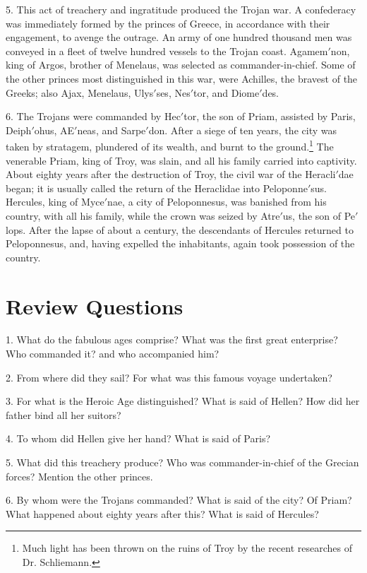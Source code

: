 \documentclass[openany,a4paper]{memoir}
\begin{document}
5. This act of treachery and ingratitude produced the Trojan war. A confederacy was immediately formed by the 
princes of Greece, in accordance with their engagement, to 
avenge the outrage. An army of one hundred thousand men 
was conveyed in a fleet of twelve hundred vessels to the 
Trojan coast. Agamem$'$non, king of Argos, brother of Menelaus, was selected as commander-in-chief. Some of the other 
princes most distinguished in this war, were Achilles, the 
bravest of the Greeks; also Ajax, Menelaus, Ulys$'$ses, Nes$'$tor, and Diome$'$des. 

6. The Trojans were commanded by Hec$'$tor, the son of 
Priam, assisted by Paris, Deiph$'$ohus, AE$'$neas, and Sarpe$'$don. After a siege of ten years, the city was taken by 
stratagem, plundered of its wealth, and burnt to the ground.\footnote{Much light has been thrown on the ruins of Troy by the recent researches of Dr. Schliemann.} 
The venerable Priam, king of Troy, was slain, and all his 
family carried into captivity. About eighty years after the 
destruction of Troy, the civil war of the Heracli$'$dae began; 
it is usually called the return of the Heraclidae into Peloponne$'$sus. Hercules, king of Myce$'$nae, a city of Peloponnesus, 
was banished from his country, with all his family, while 
the crown was seized by Atre$'$us, the son of Pe$'$lops. After 
the lapse of about a century, the descendants of Hercules returned to Peloponnesus, and, having expelled the inhabitants, 
again took possession of the country. 



\section{Review Questions}



1. What do the fabulous ages comprise? What was the 
first great enterprise? Who commanded it? and who accompanied 
him? 

2. From where did they sail? For what was this famous voyage 
undertaken?

3. For what is the Heroic Age distinguished? What is 
said of Hellen? How did her father bind all her suitors? 

4. To whom did Hellen give her hand? What is said of Paris? 

5. What did this treachery produce? Who was commander-in-chief of 
the Grecian forces? Mention the other princes.

6. By whom were 
the Trojans commanded? What is said of the city? Of Priam? What 
happened about eighty years after this? What is said of Hercules? 
\end{document}
